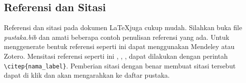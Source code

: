 \subsection{Referensi dan Sitasi}
Referensi dan sitasi pada dokumen \LaTeX juga cukup mudah. Silahkan buka file \textit{pustaka.bib} dan amati beberapa contoh penulisan referensi yang ada. Untuk menggenerate bentuk referensi seperti ini dapat menggunakan Mendeley atau Zotero. Mensitasi referensi seperti ini \citep{Priambodo_2021}, \citep{Nasuha_2017}, \citep{Dhewa_Dharmawan_Priyambodo_2017}, \citep{Arifin_2015} dapat dilakukan dengan perintah \verb|\citep{nama_label}|. Pemberian sitasi dengan benar membuat sitasi tersebut dapat di klik dan akan mengarahkan ke daftar pustaka.